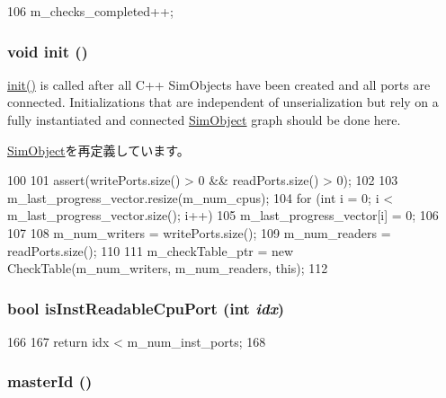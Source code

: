 \begin{DoxyCode}
106 { m_checks_completed++; }
\end{DoxyCode}
\hypertarget{classRubyTester_a02fd73d861ef2e4aabb38c0c9ff82947}{
\subsubsection[{init}]{\setlength{\rightskip}{0pt plus 5cm}void init ()}}
\label{classRubyTester_a02fd73d861ef2e4aabb38c0c9ff82947}
\hyperlink{classRubyTester_a02fd73d861ef2e4aabb38c0c9ff82947}{init()} is called after all C++ SimObjects have been created and all ports are connected. Initializations that are independent of unserialization but rely on a fully instantiated and connected \hyperlink{classSimObject}{SimObject} graph should be done here. 

\hyperlink{classSimObject_a02fd73d861ef2e4aabb38c0c9ff82947}{SimObject}を再定義しています。


\begin{DoxyCode}
100 {
101     assert(writePorts.size() > 0 && readPorts.size() > 0);
102 
103     m_last_progress_vector.resize(m_num_cpus);
104     for (int i = 0; i < m_last_progress_vector.size(); i++) {
105         m_last_progress_vector[i] = 0;
106     }
107 
108     m_num_writers = writePorts.size();
109     m_num_readers = readPorts.size();
110 
111     m_checkTable_ptr = new CheckTable(m_num_writers, m_num_readers, this);
112 }
\end{DoxyCode}
\hypertarget{classRubyTester_a42293ff3a28b9881992792d7fdee907b}{
\subsubsection[{isInstReadableCpuPort}]{\setlength{\rightskip}{0pt plus 5cm}bool isInstReadableCpuPort (int {\em idx})}}
\label{classRubyTester_a42293ff3a28b9881992792d7fdee907b}



\begin{DoxyCode}
166 {
167     return idx < m_num_inst_ports;
168 }
\end{DoxyCode}
\hypertarget{classRubyTester_a9b7d32db0521388c0953e531c79aab50}{
\subsubsection[{masterId}]{ masterId ()}}
\label{classRubyTester_a9b7d32db0521388c0953e531c79aab50}



